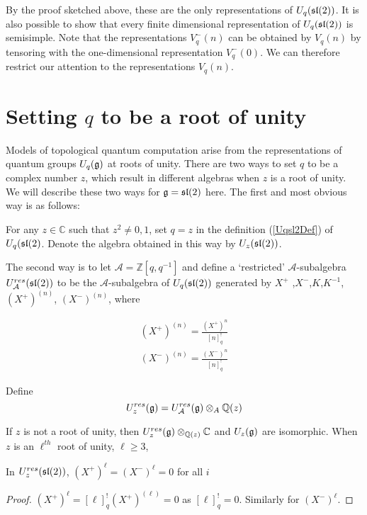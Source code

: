 By the proof sketched above, these are the only representations of
$U_q(\mathfrak{sl}(2))$. It is also possible to show that every finite dimensional
representation of $U_q(\mathfrak{sl}(2))$ is semisimple.  Note that the representations
$V_q^-(n)$ can be obtained by $V_q(n)$ by tensoring with the one-dimensional
representation $V_q^-(0)$. We can therefore restrict our attention to the
representations $V_q(n)$.


\section{Setting $q$ to be a root of unity}

Models of topological quantum computation arise from the representations of
quantum groups $U_q(\mathfrak{g})$ at roots of unity. There are two ways to set $q$ to
be a complex  number  $z$, which result in different algebras when
$z$ is a root of unity. We will describe these two ways for $\mathfrak{g} =
\mathfrak{sl}(2)$ here. The first and most obvious way is as follows: 

For any $z \in \mathbb{C}$ such that $z ^2 \neq 0,1$, set $q =
z$ in the definition (\ref{Uqsl2Def}) of $U_q(\mathfrak{sl}(2)$. Denote the
algebra obtained in this way by $U_z(\mathfrak{sl}(2))$. 

The second way is to let $\mathcal{A} = \mathbb{Z}[q,q^{-1}]$ and define a
`restricted' $\mathcal{A}$-subalgebra $U_\mathcal{A}^{res}(\mathfrak{sl}(2))$ to be the
$\mathcal{A}$-subalgebra of $U_q(\mathfrak{sl}(2))$ generated by $ X^+$ ,$X^-$,$K$,$K^{-1}$, $(X^+) ^{(n)}$,
$(X^-)^{(n)}$, where


\begin{align}
     (X^+)^{(n)} = \frac{ (X^+)^n}{[n]^!_{q}} \\
    (X^-)^{(n)} = \frac{(X^-)^n}{[n]^!_{q}} 
\end{align}


Define 
\begin{equation}
    U_z^{res}(\mathfrak{g}) = U_\mathcal{A}^{res}(\mathfrak{g}) \otimes_A \mathbb{Q}(z)
\end{equation}

If $z$ is not a root of unity, then $U_z^{res}(\mathfrak{g})
\otimes_{\mathbb{Q}(z)} \mathbb{C}$ and $U_z(\mathfrak{g})$ are
isomorphic. When $z$ is an $\ell^{th}$ root of unity, $\ell \geq 3$,

\begin{lemma}
    In $U_z^{res}(\mathfrak{sl}(2))$, $ (X^+)^\ell = (X^-)^\ell = 0$ for all $i$
\end{lemma}
\begin{proof}
    $ (X^+)^\ell = [\ell]_{q}^!  (X^+)^{(\ell)} = 0$ as $[\ell]_{q}^! = 0$. Similarly for $(X^-)^\ell$.
\end{proof}

